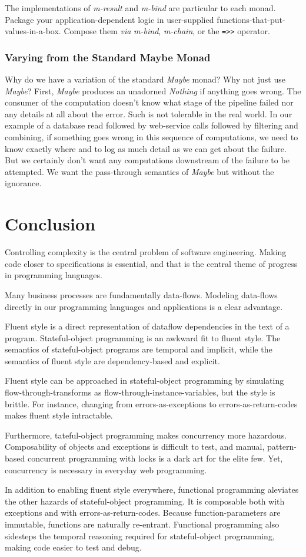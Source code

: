 \documentclass[11pt]{article}
\begin{document}
The implementations of \emph{m-result} and \emph{m-bind} are particular to
each monad. Package your application-dependent logic in
user-supplied functions-that-put-values-in-a-box. Compose them \emph{via}
\emph{m-bind}, \emph{m-chain}, or the \verb|=>>| operator.
\subsubsection{Varying from the Standard Maybe Monad}
\label{sec-3-2-3}

Why do we have a variation of the standard \emph{Maybe} monad? Why not
just use \emph{Maybe}? First, \emph{Maybe} produces an unadorned \emph{Nothing} if
anything goes wrong. The consumer of the computation doesn't know
what stage of the pipeline failed nor any details at all about the
error. Such is not tolerable in the real world. In our example of a
database read followed by web-service calls followed by filtering
and combining, if something goes wrong in this sequence of
computations, we need to know exactly where and to log as much
detail as we can get about the failure. But we certainly don't want
any computations downstream of the failure to be attempted. We
want the pass-through semantics of \emph{Maybe} but without the ignorance.
\section{Conclusion}
\label{sec-4}

Controlling complexity is the central problem of software
engineering. Making code closer to specifications is essential, and
that is the central theme of progress in programming languages. 

Many business processes are fundamentally data-flows. Modeling
data-flows directly in our programming languages and applications is
a clear advantage.

Fluent style is a direct representation of dataflow dependencies in
the text of a program. Stateful-object programming is an awkward fit
to fluent style. The semantics of stateful-object programs are
temporal and implicit, while the semantics of fluent style are
dependency-based and explicit.

Fluent style can be approached in stateful-object programming by
simulating flow-through-transforms as
flow-through-instance-variables, but the style is brittle. For
instance, changing from errors-as-exceptions to
errors-as-return-codes makes fluent style intractable.

Furthermore, tateful-object programming makes concurrency more
hazardous. Composability of objects and exceptions is difficult to
test, and manual, pattern-based concurrent programming with locks is
a dark art for the elite few. Yet, concurrency is necessary in
everyday web programming.

In addition to enabling fluent style everywhere, functional
programming aleviates the other hazards of stateful-object
programming. It is composable both with exceptions and with
errors-as-return-codes. Because function-parameters are immutable,
functions are naturally re-entrant. Functional programming also
sidesteps the temporal reasoning required for stateful-object
programming, making code easier to test and debug.
\end{document}
